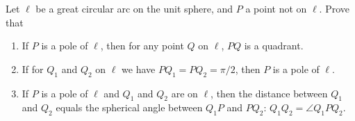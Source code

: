\begin{tcolorbox}[title={Distances and Great Circles}]
   \begin{question}
       Let $\ell$ be a great circular arc on the unit sphere, and $P$ a point not on $\ell$. Prove that
       \begin{enumerate}
           \item If $P$ is a pole of $\ell$, then for any point $Q$ on $\ell$, $PQ$ is a quadrant.
           \item If for $Q_1$ and $Q_2$ on $\ell$ we have $PQ_1=PQ_2=\pi/2$, then $P$ is a pole of $\ell$.
           \item If $P$ is a pole of $\ell$ and $Q_1$ and $Q_2$ are on $\ell$, then the distance between $Q_1$ and $Q_2$ equals the spherical angle between $Q_1P$ and $PQ_2$: $Q_1Q_2 = \angle Q_1PQ_2$.
       \end{enumerate}
   \end{question}
\end{tcolorbox}



